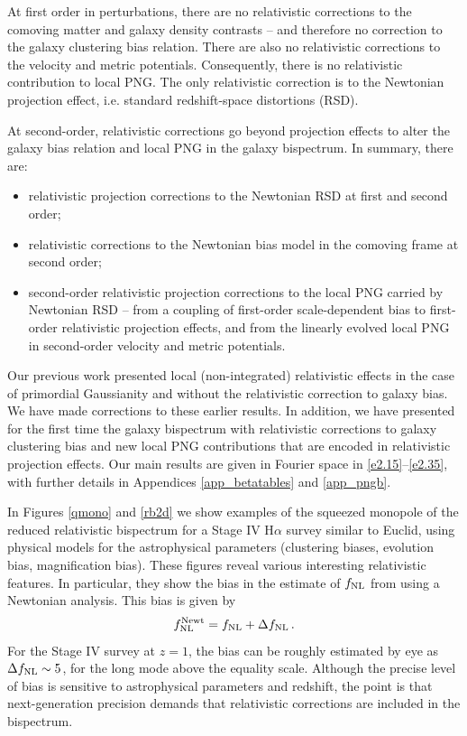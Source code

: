 {{{At first order in perturbations, there are no relativistic corrections to the comoving matter and galaxy density contrasts -- and therefore no correction to the galaxy clustering bias relation.  There are also no relativistic corrections to the velocity and metric potentials.  Consequently, there is no relativistic contribution to local PNG. The only relativistic correction is to the Newtonian projection effect, i.e. standard redshift-space distortions (RSD). 

At second-order, relativistic corrections go beyond projection effects to alter the galaxy bias relation and local PNG in the galaxy bispectrum. In summary, there are: 
\begin{itemize}
\item
relativistic projection corrections to the Newtonian RSD at first and second order;
\item
relativistic corrections to the Newtonian bias model in the comoving frame at second order;
\item
 second-order relativistic projection  corrections to the local PNG carried by Newtonian RSD -- from a coupling of first-order scale-dependent bias to first-order relativistic projection effects,  and from the linearly evolved local PNG in second-order velocity and metric potentials. 
 \end{itemize}

Our previous work \cite{Umeh:2016nuh,Jolicoeur:2017nyt, Jolicoeur:2017eyi, Jolicoeur:2018blf,Clarkson:2018dwn,Maartens:2019yhx,deWeerd:2019cae, Jolicoeur:2020eup} presented local (non-integrated) relativistic effects in the case of primordial Gaussianity and without the relativistic correction to galaxy bias. We have made corrections to these earlier results. In addition,  we have presented for the first time the galaxy bispectrum with relativistic corrections to galaxy clustering bias and new local PNG contributions that are encoded in relativistic projection effects.
Our main results are given  in Fourier space in \eqref{e2.15}--\eqref{e2.35}, with further details in Appendices \ref{app_betatables} and \ref{app_pngb}.

In Figures \ref{qmono} and \ref{rb2d}  we show examples of the squeezed monopole of the  reduced relativistic bispectrum for a Stage IV H$\alpha$ survey similar to Euclid, using physical models for the astrophysical parameters (clustering biases, evolution bias, magnification bias). These figures reveal various interesting relativistic features. In particular, they show  the bias in the estimate of $f_\text{NL}$ from using a Newtonian analysis. This bias is given by
\begin{equation}
f_\text{NL}^{\mathrm{Newt}} = f_\text{NL} + \Delta f_\text{NL}\,.
\end{equation}
For the Stage IV survey at $z=1$, the bias can be roughly estimated by eye as $\Delta f_\text{NL}\sim 5$, for the long mode above the equality scale. Although the precise level of bias is sensitive to astrophysical parameters and redshift, the point is that next-generation precision demands that relativistic corrections are included in the bispectrum.

}}}

